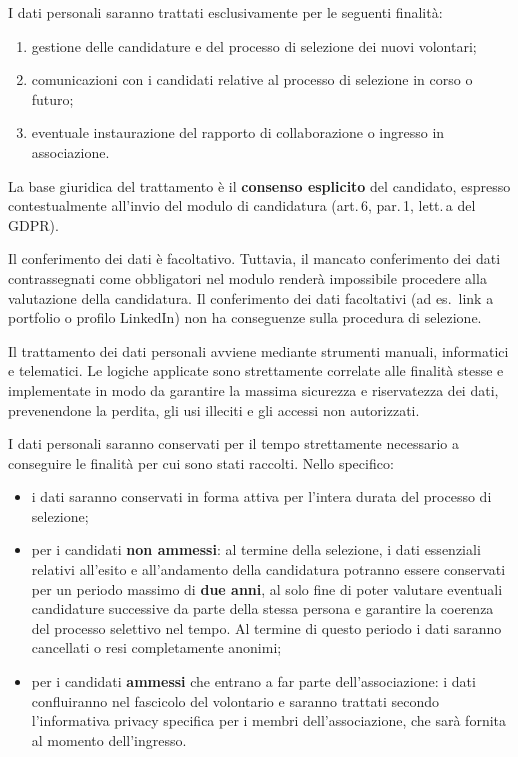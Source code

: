 \documentclass[legal]{polinetwork}
\begin{document}

I dati personali saranno trattati esclusivamente per le seguenti finalità:

\begin{enumerate}
  \item gestione delle candidature e del processo di selezione dei nuovi
    volontari;
  \item comunicazioni con i candidati relative al processo di selezione in
    corso o futuro;
  \item eventuale instaurazione del rapporto di collaborazione o ingresso
    in associazione.
\end{enumerate}

La base giuridica del trattamento è il \textbf{consenso esplicito} del
candidato, espresso contestualmente all'invio del modulo di candidatura
(art.\,6, par.\,1, lett.\,a del GDPR).

Il conferimento dei dati è facoltativo. Tuttavia, il mancato conferimento
dei dati contrassegnati come obbligatori nel modulo renderà impossibile
procedere alla valutazione della candidatura. Il conferimento dei dati
facoltativi (ad es.\ link a portfolio o profilo LinkedIn) non ha
conseguenze sulla procedura di selezione.


Il trattamento dei dati personali avviene mediante strumenti manuali,
informatici e telematici. Le logiche applicate sono strettamente correlate
alle finalità stesse e implementate in modo da garantire la massima
sicurezza e riservatezza dei dati, prevenendone la perdita, gli usi
illeciti e gli accessi non autorizzati.


I dati personali saranno conservati per il tempo strettamente necessario a
conseguire le finalità per cui sono stati raccolti. Nello specifico:

\begin{itemize}
  \item i dati saranno conservati in forma attiva per l'intera durata del
    processo di selezione;
  \item per i candidati \textbf{non ammessi}: al termine della selezione,
    i dati essenziali relativi all'esito e all'andamento della candidatura
    potranno essere conservati per un periodo massimo di \textbf{due anni},
    al solo fine di poter valutare eventuali candidature successive da
    parte della stessa persona e garantire la coerenza del processo
    selettivo nel tempo. Al termine di questo periodo i dati saranno
    cancellati o resi completamente anonimi;
  \item per i candidati \textbf{ammessi} che entrano a far parte
    dell'associazione: i dati confluiranno nel fascicolo del volontario e
    saranno trattati secondo l'informativa privacy specifica per i membri
    dell'associazione, che sarà fornita al momento dell'ingresso.
\end{itemize}
\end{document}
